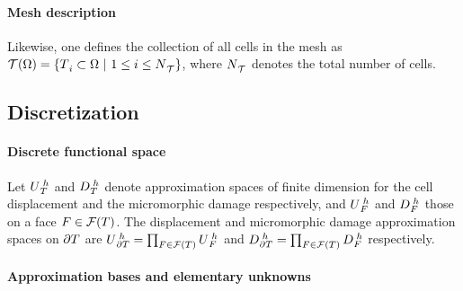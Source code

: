 \paragraph{Mesh description}

Likewise, one defines the collection of all cells in the mesh
as $\mathcal{T}({\Omega}) = \{ {{T}}{}_{i}^{} \subset {\Omega} \ \vert \ 1 \leq i
\leq {N}{}_{\mathcal{T}}^{} \}$, where ${N}{}_{\mathcal{T}}^{}$ denotes the total number of cells.

\subsection{Discretization}

\paragraph{Discrete functional space}

Let ${U}{}_{{T}}^{\; h}$ and ${D}{}_{{T}}^{\; h}$ denote
approximation spaces of finite dimension for the cell displacement and the micromorphic damage respectively,
and ${U}{}_{{F}}^{\; h}$ and ${D}{}_{{F}}^{\; h}$ those
on a face ${F} \in \mathcal{F}({T})$.
The displacement and micromorphic damage approximation spaces on ${\partial T}$ are
${U}{}_{{\partial T}}^{\; h} = \prod_{{F} \in \mathcal{F}({T})} {U}{}_{{F}}^{\; h}$
and ${D}{}_{{\partial T}}^{\; h} = \prod_{{F} \in \mathcal{F}({T})} {D}{}_{{F}}^{\; h}$
respectively.

\paragraph{Approximation bases and elementary unknowns}

